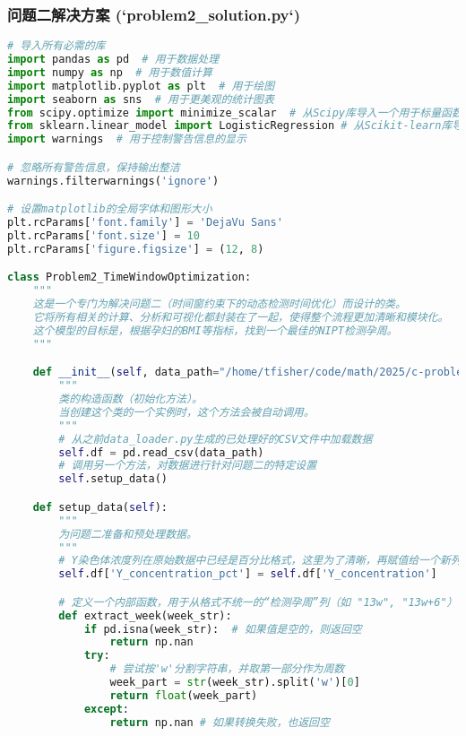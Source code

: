 \documentclass[UTF8, a4paper, 11pt]{ctexart}
\begin{document}
\subsubsection{问题二解决方案 (`problem2_solution.py`)}
\begin{lstlisting}[language=Python, caption={问题二的解决方案脚本。}]
# 导入所有必需的库
import pandas as pd  # 用于数据处理
import numpy as np  # 用于数值计算
import matplotlib.pyplot as plt  # 用于绘图
import seaborn as sns  # 用于更美观的统计图表
from scipy.optimize import minimize_scalar  # 从Scipy库导入一个用于标量函数优化的工具
from sklearn.linear_model import LogisticRegression # 从Scikit-learn库导入逻辑回归模型
import warnings  # 用于控制警告信息的显示

# 忽略所有警告信息，保持输出整洁
warnings.filterwarnings('ignore')

# 设置matplotlib的全局字体和图形大小
plt.rcParams['font.family'] = 'DejaVu Sans'
plt.rcParams['font.size'] = 10
plt.rcParams['figure.figsize'] = (12, 8)

class Problem2_TimeWindowOptimization:
    """
    这是一个专门为解决问题二（时间窗约束下的动态检测时间优化）而设计的类。
    它将所有相关的计算、分析和可视化都封装在了一起，使得整个流程更加清晰和模块化。
    这个模型的目标是，根据孕妇的BMI等指标，找到一个最佳的NIPT检测孕周。
    """

    def __init__(self, data_path="/home/tfisher/code/math/2025/c-problem/new-plan/processed_data.csv"):
        """
        类的构造函数（初始化方法）。
        当创建这个类的一个实例时，这个方法会被自动调用。
        """
        # 从之前data_loader.py生成的已处理好的CSV文件中加载数据
        self.df = pd.read_csv(data_path)
        # 调用另一个方法，对数据进行针对问题二的特定设置
        self.setup_data()

    def setup_data(self):
        """
        为问题二准备和预处理数据。
        """
        # Y染色体浓度列在原始数据中已经是百分比格式，这里为了清晰，再赋值给一个新列
        self.df['Y_concentration_pct'] = self.df['Y_concentration']

        # 定义一个内部函数，用于从格式不统一的“检测孕周”列（如 "13w", "13w+6"）中提取周数
        def extract_week(week_str):
            if pd.isna(week_str):  # 如果值是空的，则返回空
                return np.nan
            try:
                # 尝试按'w'分割字符串，并取第一部分作为周数
                week_part = str(week_str).split('w')[0]
                return float(week_part)
            except:
                return np.nan # 如果转换失败，也返回空


\end{lstlisting}
\end{document}
